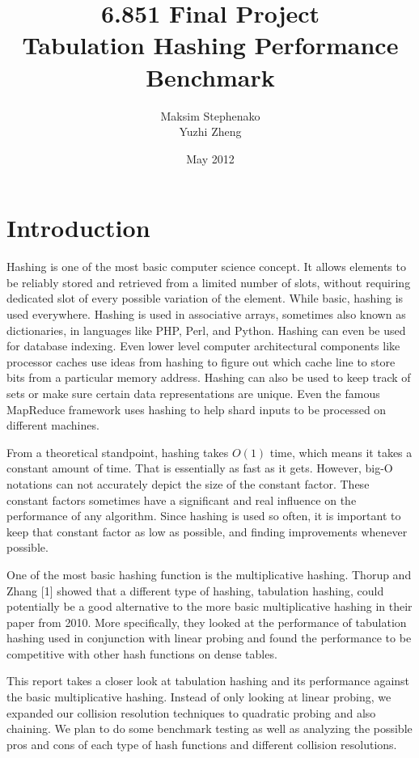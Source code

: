 \documentclass[11pt]{article}
\title{6.851 Final Project \\ Tabulation Hashing Performance Benchmark}
\author{Maksim Stephenako \\ Yuzhi Zheng}
\date{May 2012}
\begin{document}
\setlength{\baselineskip}{1.15\baselineskip}

\ifpdf
{}
\else
{}
\fi

\maketitle

\section{Introduction}
Hashing is one of the most basic computer science concept. 
It allows elements to be reliably stored and 
retrieved from a limited number of slots, without requiring dedicated slot of every possible 
variation of the element. While basic, hashing is used everywhere. Hashing is used in 
associative arrays, sometimes also known as dictionaries, in languages like 
PHP, Perl, and Python. Hashing can even be used for database indexing. 
Even lower level computer architectural components like processor caches 
use ideas from hashing to figure out which cache line to store bits from a particular
memory address. Hashing can also be used to keep track of sets or make 
sure certain data representations are unique. Even the famous MapReduce
framework uses hashing to help shard inputs to be processed on different machines.

From a theoretical standpoint, hashing takes $O(1)$ time, which means it takes a constant
amount of time. That is essentially as fast as it gets. However, big-O notations can not
accurately depict the size of the constant factor. These constant factors sometimes
have a significant and real influence on the performance of any algorithm. 
Since hashing is used so often, it is important to keep that constant factor
as low as possible, and finding improvements whenever possible.

One of the most basic hashing function is the multiplicative hashing. 
Thorup and Zhang [1] showed that a different type of hashing, tabulation hashing,
could potentially be a good alternative to the more basic multiplicative hashing 
in their paper from 2010. More specifically, they looked at the performance of tabulation hashing
used in conjunction with linear probing and found the performance to be competitive with
other hash functions on dense tables.

This report takes a closer look at tabulation hashing and its performance 
against the basic multiplicative hashing. Instead of only looking at linear 
probing, we expanded our collision resolution techniques to quadratic probing 
and also chaining. We plan to do some benchmark testing as well as  
analyzing the possible pros and cons of each type of hash functions and 
different collision resolutions.
\end{document}
